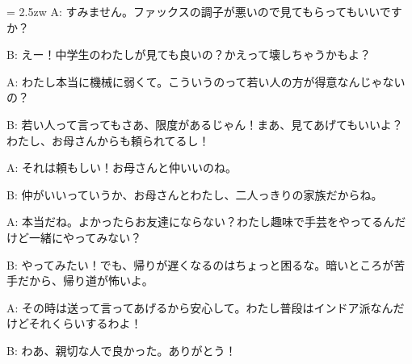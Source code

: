 \documentclass[11pt]{amsart}
\title{}
\author{}
\newenvironment{hangall}[1]{\hangindent = 2.5zw\everypar{\hangindent = 2.5zw}}{}
\begin{document}
\maketitle
\begin{hangall}{}%
A: すみません。ファックスの調子が悪いので見てもらってもいいですか？



B: えー！中学生のわたしが見ても良いの？かえって壊しちゃうかもよ？



A: わたし本当に機械に弱くて。こういうのって若い人の方が得意なんじゃないの？



B: 若い人って言ってもさあ、限度があるじゃん！まあ、見てあげてもいいよ？わたし、お母さんからも頼られてるし！



A: それは頼もしい！お母さんと仲いいのね。



B: 仲がいいっていうか、お母さんとわたし、二人っきりの家族だからね。



A: 本当だね。よかったらお友達にならない？わたし趣味で手芸をやってるんだけど一緒にやってみない？



B: やってみたい！でも、帰りが遅くなるのはちょっと困るな。暗いところが苦手だから、帰り道が怖いよ。



A: その時は送って言ってあげるから安心して。わたし普段はインドア派なんだけどそれくらいするわよ！



B: わあ、親切な人で良かった。ありがとう！\end{hangall}
\end{document}
